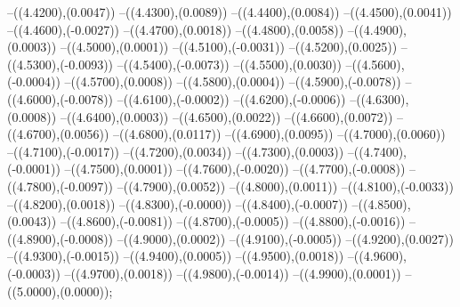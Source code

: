 {	--({\sx*(4.4200)},{\sy*(0.0047)})
	--({\sx*(4.4300)},{\sy*(0.0089)})
	--({\sx*(4.4400)},{\sy*(0.0084)})
	--({\sx*(4.4500)},{\sy*(0.0041)})
	--({\sx*(4.4600)},{\sy*(-0.0027)})
	--({\sx*(4.4700)},{\sy*(0.0018)})
	--({\sx*(4.4800)},{\sy*(0.0058)})
	--({\sx*(4.4900)},{\sy*(0.0003)})
	--({\sx*(4.5000)},{\sy*(0.0001)})
	--({\sx*(4.5100)},{\sy*(-0.0031)})
	--({\sx*(4.5200)},{\sy*(0.0025)})
	--({\sx*(4.5300)},{\sy*(-0.0093)})
	--({\sx*(4.5400)},{\sy*(-0.0073)})
	--({\sx*(4.5500)},{\sy*(0.0030)})
	--({\sx*(4.5600)},{\sy*(-0.0004)})
	--({\sx*(4.5700)},{\sy*(0.0008)})
	--({\sx*(4.5800)},{\sy*(0.0004)})
	--({\sx*(4.5900)},{\sy*(-0.0078)})
	--({\sx*(4.6000)},{\sy*(-0.0078)})
	--({\sx*(4.6100)},{\sy*(-0.0002)})
	--({\sx*(4.6200)},{\sy*(-0.0006)})
	--({\sx*(4.6300)},{\sy*(0.0008)})
	--({\sx*(4.6400)},{\sy*(0.0003)})
	--({\sx*(4.6500)},{\sy*(0.0022)})
	--({\sx*(4.6600)},{\sy*(0.0072)})
	--({\sx*(4.6700)},{\sy*(0.0056)})
	--({\sx*(4.6800)},{\sy*(0.0117)})
	--({\sx*(4.6900)},{\sy*(0.0095)})
	--({\sx*(4.7000)},{\sy*(0.0060)})
	--({\sx*(4.7100)},{\sy*(-0.0017)})
	--({\sx*(4.7200)},{\sy*(0.0034)})
	--({\sx*(4.7300)},{\sy*(0.0003)})
	--({\sx*(4.7400)},{\sy*(-0.0001)})
	--({\sx*(4.7500)},{\sy*(0.0001)})
	--({\sx*(4.7600)},{\sy*(-0.0020)})
	--({\sx*(4.7700)},{\sy*(-0.0008)})
	--({\sx*(4.7800)},{\sy*(-0.0097)})
	--({\sx*(4.7900)},{\sy*(0.0052)})
	--({\sx*(4.8000)},{\sy*(0.0011)})
	--({\sx*(4.8100)},{\sy*(-0.0033)})
	--({\sx*(4.8200)},{\sy*(0.0018)})
	--({\sx*(4.8300)},{\sy*(-0.0000)})
	--({\sx*(4.8400)},{\sy*(-0.0007)})
	--({\sx*(4.8500)},{\sy*(0.0043)})
	--({\sx*(4.8600)},{\sy*(-0.0081)})
	--({\sx*(4.8700)},{\sy*(-0.0005)})
	--({\sx*(4.8800)},{\sy*(-0.0016)})
	--({\sx*(4.8900)},{\sy*(-0.0008)})
	--({\sx*(4.9000)},{\sy*(0.0002)})
	--({\sx*(4.9100)},{\sy*(-0.0005)})
	--({\sx*(4.9200)},{\sy*(0.0027)})
	--({\sx*(4.9300)},{\sy*(-0.0015)})
	--({\sx*(4.9400)},{\sy*(0.0005)})
	--({\sx*(4.9500)},{\sy*(0.0018)})
	--({\sx*(4.9600)},{\sy*(-0.0003)})
	--({\sx*(4.9700)},{\sy*(0.0018)})
	--({\sx*(4.9800)},{\sy*(-0.0014)})
	--({\sx*(4.9900)},{\sy*(0.0001)})
	--({\sx*(5.0000)},{\sy*(0.0000)});
}
